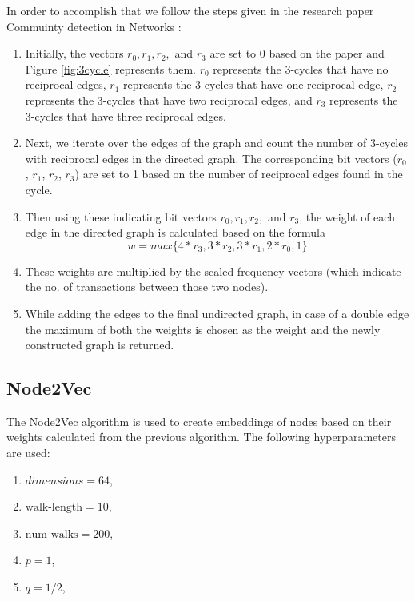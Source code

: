 \documentclass[12pt,a4paper]{article}
\begin{document}
In order to accomplish that we follow the steps given in the research paper Commuinty detection in Networks : 
\begin{enumerate}
    \item Initially, the vectors $r_0, r_1, r_2,$ and $r_3$ are set to  0 based on the paper and Figure \ref{fig:3cycle} represents them. $r_0$ represents the 3-cycles that have no reciprocal edges, $r_1$ represents the 3-cycles that have one reciprocal edge, $r_2$ represents the 3-cycles that have two reciprocal edges, and $r_3$ represents the 3-cycles that have three reciprocal edges.
    \item Next, we iterate over the edges of the graph and count the number of 3-cycles with reciprocal edges in the directed graph. The corresponding bit vectors ($r_0$, $r_1$, $r_2$, $r_3$) are set to 1 based on the number of reciprocal edges found in the cycle.
    \item Then using these indicating bit vectors $r_0, r_1, r_2,$ and $r_3$, the weight of each edge in the directed graph is calculated based on the formula $$ w = max \{ 4 \ast r_3, 3\ast r_2, 3\ast r_1, 2\ast r_0, 1 \}$$
    \item These weights are multiplied by the scaled frequency vectors (which indicate the no. of transactions between those two nodes).
    \item While adding the edges to the final undirected graph, in case of a double edge the maximum of both the weights is chosen as the weight and the newly constructed graph is returned. 
\end{enumerate}

\subsection{Node2Vec}
    The Node2Vec algorithm is used to create embeddings of nodes based on their weights calculated from the previous algorithm. The following hyperparameters are used:
    \begin{enumerate}
    \item $dimensions=64$, 
    \item $\text{walk-length}=10 $, 
    \item $\text{num-walks}=200$, 
    \item $p=1$, 
    \item $q=1/2$, 
\end{enumerate}
\end{document}
